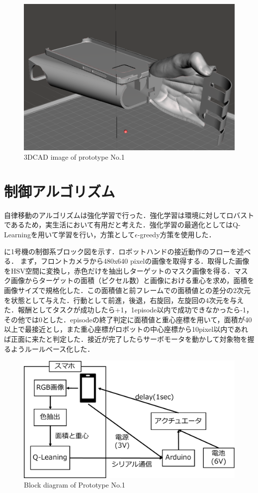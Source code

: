 \begin{figure}[H]
    \centering
    \includegraphics[width=\linewidth]{figure/chapter3/robothand-v1_cad}
    \caption{3DCAD image of prototype No.1}
    \label{fig:1号機CAD}
\end{figure}


\section{制御アルゴリズム}
自律移動のアルゴリズムは強化学習で行った．強化学習は環境に対してロバストであるため，実生活において有用だと考えた．強化学習の最適化としてはQ-Learningを用いて学習を行い，方策として$\epsilon$-greedy方策を使用した．

に1号機の制御系ブロック図を示す．ロボットハンドの接近動作のフローを述べる．
まず，フロントカメラから480x640 pixelの画像を取得する．取得した画像をHSV空間に変換し，赤色だけを抽出しターゲットのマスク画像を得る．マスク画像からターゲットの面積（ピクセル数）と画像における重心を求め，面積を画像サイズで規格化した．この面積値と前フレームでの面積値との差分の2次元を状態として与えた．行動として前進，後退，右旋回，左旋回の4次元を与えた．報酬としてタスクが成功したら+1，1episode以内で成功できなかったら-1，その他では0とした．episodeの終了判定に面積値と重心座標を用いて，面積が40以上で最接近とし，また重心座標がロボットの中心座標から10pixel以内であれば正面に来たと判定した．接近が完了したらサーボモータを動かして対象物を握るようルールベース化した．

\begin{figure}[H]
    \centering
    \includegraphics[width=0.7\linewidth]{figure/chapter3/1号機制御図}
    \caption{Block diagram of Prototype No.1}
    \label{fig:1号機制御図}
\end{figure}


